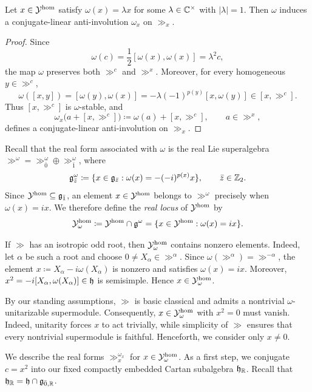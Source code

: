 \begin{lemma}\label{lemm::real_form_descend}
Let $x\in{\mathcal Y}^{\hom}$ satisfy $\omega(x)=\lambda x$ for some $\lambda\in{\mathbb C}^{\times}$ with $\vert \lambda\vert=1$. Then $\omega$ induces a conjugate-linear anti-involution $\omega_x$ on $\gg_x$.
\end{lemma}

\begin{proof}
Since
\[
\omega(c)
=\frac12[\omega(x),\omega(x)]
=\lambda^2c,
\]
the map $\omega$ preserves both $\gg^c$ and $\gg^x$. Moreover, for every homogeneous $y\in\gg^c$,
\[
\omega([x,y])
=[\omega(y),\omega(x)]
=-\lambda(-1)^{p(y)}[x,\omega(y)]
\in[x,\gg^c].
\]
Thus $[x,\gg^c]$ is $\omega$-stable, and
\[
\omega_x\bigl(a+[x,\gg^c]\bigr)
\coloneqq\omega(a)+[x,\gg^c],
\qquad a\in\gg^x,
\]
defines a conjugate-linear anti-involution on $\gg_x$.
\end{proof}

Recall that the real form associated with $\omega$ is the real Lie superalgebra
$\gg^\omega=\gg^\omega_{\bar0}\oplus\gg^\omega_{\bar1}$, where
\begin{equation}
{\mathfrak{g}}^\omega_{\bar{z}}
\coloneqq
\{x\in{\mathfrak{g}}_{\bar{z}}:\omega(x)=-(-i)^{p(x)} x\},
\qquad \bar{z}\in {\mathbb Z}_{2}.
\end{equation}
 Since ${\mathcal Y}^{\hom}\subseteq{\mathfrak{g}_{\bar{1}}}$, an element $x\in{\mathcal Y}^{\hom}$ belongs to $\gg^\omega$ precisely when $\omega(x)=ix$. We therefore define the \emph{real locus} of ${\mathcal Y}^{\hom}$ by
\begin{equation}
{\mathcal Y}^{\hom}_\omega
\coloneqq
{\mathcal Y}^{\hom}\cap{\mathfrak{g}}^\omega
=
\{x\in{\mathcal Y}^{\hom}:\omega(x)=ix\}.
\end{equation}

If $\gg$ has an isotropic odd root, then ${\mathcal Y}^{\hom}_\omega$ contains nonzero elements. Indeed, let $\alpha$ be such a root and choose $0\neq X_\alpha\in\gg^\alpha$. Since $\omega(\gg^\alpha)=\gg^{-\alpha}$, the element
$
x\coloneqq X_\alpha-i\omega(X_\alpha)
$
is nonzero and satisfies $\omega(x)=ix$. Moreover,
$
x^2=-i[X_\alpha,\omega(X_\alpha)]\in{\mathfrak h}
$
is semisimple. Hence $x\in{\mathcal Y}^{\hom}_\omega$. 


By our standing assumptions, $\gg$ is basic classical and admits a nontrivial $\omega$-unitarizable supermodule. Consequently, $x\in{\mathcal Y}_\omega^{\hom}$ with $x^2=0$ must vanish. Indeed, unitarity forces $x$ to act trivially, while simplicity of $\gg$ ensures that every nontrivial supermodule is faithful. Henceforth, we consider only $x\neq0$.

We describe the real forms $\gg_x^{\omega_x}$ for $x\in{\mathcal Y}_\omega^{\hom}$. As a first step, we conjugate $c=x^2$ into our fixed compactly embedded Cartan subalgebra ${\mathfrak h}_{{\mathbb R}}$. Recall that ${\mathfrak h}_{{\mathbb R}}={\mathfrak h}\cap{\mathfrak{g}}_{\bar0,{\mathbb R}}$.

